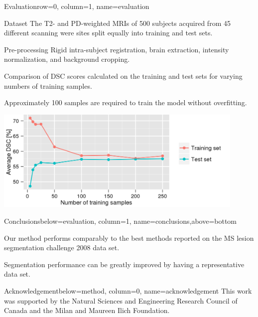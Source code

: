 \documentclass[%
portrait,paperwidth=841mm,paperheight=1180mm,%
margin=2cm,
fontscale=0.32
]{baposter}
\begin{document}
\begin{poster}
\begin{headerblock}{Evaluation}{row=0, column=1, name=evaluation}
\begin{compactdesc}
\item[Dataset] The T2- and PD-weighted MRIs of 500 subjects acquired from 45
different scanning were sites split equally into training and test sets.
\item[Pre-processing] Rigid intra-subject registration, brain extraction,
intensity normalization, and background cropping.
\end{compactdesc}
\begin{compactitem}
\item Comparison of DSC scores calculated on the training and test sets for
varying numbers of training samples.
\item Approximately 100 samples are required to train the model without
overfitting.
\end{compactitem}
\begin{center}
\includegraphics[width=0.9\textwidth]{figures/train_count}
\end{center}
\end{headerblock}

\begin{headerblock}{Conclusions}{below=evaluation, column=1,
name=conclusions,above=bottom}
\begin{compactitem} 
  \item Our method performs comparably to the best methods reported on the MS
lesion segmentation challenge 2008 data set.
  \item Segmentation performance can be greatly improved by having a
  representative data set.
\end{compactitem} 
\end{headerblock}

\begin{headerblock}{Acknowledgement}{below=method, column=0,
name=acknowledgement}
This work was supported by the Natural Sciences and
Engineering Research Council of Canada and the Milan and Maureen Ilich Foundation.
\end{headerblock}


\end{poster}
\end{document}
